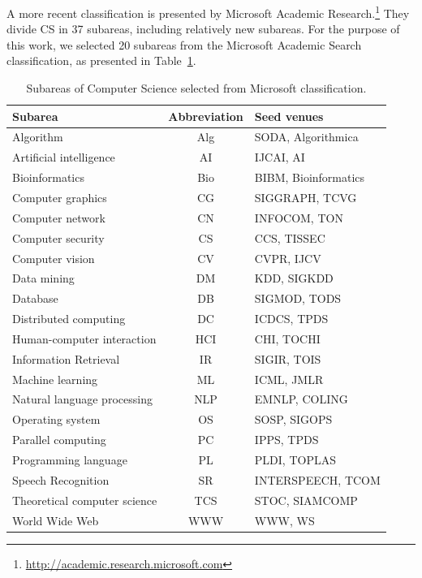 \documentclass[msc]{ppgccufmg}
\begin{document}
A more recent classification is presented by Microsoft Academic Research.\footnote{\url{http://academic.research.microsoft.com}} They divide CS in 37 subareas, including relatively new subareas. For the purpose of this work, we selected 20 subareas from the Microsoft Academic Search classification, as presented in Table~\ref{tab:subareas}.

\begin{table}[h]
\small
\centering
\caption{Subareas of Computer Science selected from Microsoft classification.}
\label{tab:subareas}
\begin{tabular}{l|c|l}
\toprule
Subarea 					 & Abbreviation & Seed venues          \\ \hline
Algorithm                    & Alg          & SODA, Algorithmica   \\ \hline
Artificial intelligence      & AI           & IJCAI, AI            \\ \hline
Bioinformatics               & Bio          & BIBM, Bioinformatics \\ \hline
Computer graphics            & CG           & SIGGRAPH, TCVG       \\ \hline
Computer network             & CN           & INFOCOM, TON         \\ \hline
Computer security            & CS           & CCS, TISSEC          \\ \hline
Computer vision              & CV           & CVPR, IJCV           \\ \hline
Data mining                  & DM           & KDD, SIGKDD          \\ \hline
Database                     & DB           & SIGMOD, TODS         \\ \hline
Distributed computing        & DC           & ICDCS, TPDS          \\ \hline
Human-computer interaction   & HCI          & CHI, TOCHI           \\ \hline
Information Retrieval        & IR           & SIGIR, TOIS          \\ \hline
Machine learning             & ML           & ICML, JMLR           \\ \hline
Natural language processing  & NLP          & EMNLP, COLING        \\ \hline
Operating system             & OS           & SOSP, SIGOPS         \\ \hline
Parallel computing           & PC           & IPPS, TPDS           \\ \hline
Programming language         & PL           & PLDI, TOPLAS         \\ \hline
Speech Recognition           & SR           & INTERSPEECH, TCOM    \\ \hline
Theoretical computer science & TCS          & STOC, SIAMCOMP       \\ \hline
World Wide Web               & WWW          & WWW, WS              \\ 
\bottomrule
\end{tabular}
\end{table}
\end{document}
